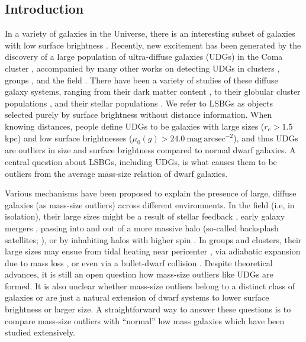 \documentclass[twocolumn,astrosymb,twocolappendix]{aastex631}
\newcommand{\sbunit}{\mathrm{mag\ arcsec}^{-2}}
\newcommand{\sbcen}{\mu_{0}(g)}
\begin{document}
\begin{CJK*}{UTF8}{gbsn}
\section{Introduction} \label{sec:intro}
In a variety of galaxies in the Universe, there is an interesting subset of galaxies with low surface brightness \citep[dubbed low surface brightness galaxies or LSBGs, e.g.,][]{Sandage1984,Caldwell1987,Impey1988,McGaugh1995,Dalcanton1997a}. Recently, new excitement has been generated by the discovery of a large population of ultra-diffuse galaxies (UDGs) in the Coma cluster \citep{vanDokkum2015}, accompanied by many other works on detecting UDGs in clusters \citep[e.g.,][]{Koda2015,Mihos2015,Yagi2016,vdBurg2016,vdBurg2017,Lee2017,ManceraPina2018,Zaritsky2019,Danieli2019}, groups \citep[e.g.,][]{Roman2017b,Greco2018,SAGA-II,Roman2021,CarlstenELVES2022}, and the field \citep[e.g.,][]{Leisman2017,Roman2019,Prole2019,Tanoglidis2021,Kadowaki2021}. There have been a variety of studies of these diffuse galaxy systems, ranging from their dark matter content \citep[e.g.,][]{Mowla2017,vanDokkum2018,vanDokkum2019,Danieli2019DF2,Wasserman2019,Keim2022}, to their globular cluster populations \citep[e.g.,][]{vanDokkum2017,Somalwar2020,Forbes2020,Danieli2022,Gannon2022,vanDokkum2022GC}, and their stellar populations \citep[e.g.,][]{Gu2018,Ferre-Mateu2018,Pandya2018,Villaume2022}. We refer to LSBGs as objects selected purely by surface brightness without distance information. When knowing distances, people define UDGs to be galaxies with large sizes ($r_e > 1.5$ kpc) and low surface brightnesses ($\sbcen > 24.0\ \sbunit$), and thus UDGs are outliers in size and surface brightness compared to normal dwarf galaxies. A central question about LSBGs, including UDGs, is what causes them to be outliers from the average mass-size relation of dwarf galaxies.

Various mechanisms have been proposed to explain the presence of large, diffuse galaxies (as mass-size outliers) across different environments. In the field (i.e, in isolation), their large sizes might be a result of stellar feedback \citep{DiCintio2017,Chan2018}, early galaxy mergers \citep{Wright2021}, passing into and out of a more massive halo (so-called backsplash satellites; \citealt{Benavides2021}), or by inhabiting halos with higher spin \citep{Dalcanton1997,Amorisco2016,Liao2019,Benavides2022}. In groups and clusters, their large sizes may ensue from tidal heating near pericenter \citep{Jiang2019}, via adiabatic expansion due to mass loss \citep{Tremmel2020}, or even via a bullet-dwarf collision \citep{vandokkum2022Nat,vanDokkum2022GC}. Despite theoretical advances, it is still an open question how mass-size outliers like UDGs are formed. It is also unclear whether mass-size outliers belong to a distinct class of galaxies or are just a natural extension of dwarf systems to lower surface brightness or larger size. A straightforward way to answer these questions is to compare mass-size outliers with ``normal'' low mass galaxies which have been studied extensively. 


\end{CJK*}
\end{document}
